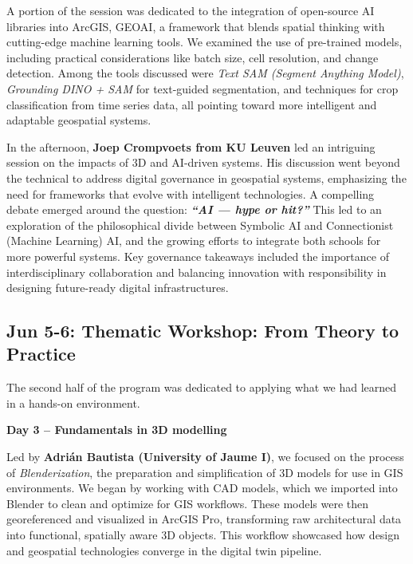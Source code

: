 \documentclass[
  letterpaper,
  DIV=11,
  numbers=noendperiod]{scrartcl}
\begin{document}
A portion of the session was dedicated to the integration of open-source
AI libraries into ArcGIS, GEOAI, a framework that blends spatial
thinking with cutting-edge machine learning tools. We examined the use
of pre-trained models, including practical considerations like batch
size, cell resolution, and change detection. Among the tools discussed
were \emph{Text SAM (Segment Anything Model)}, \emph{Grounding DINO +
SAM} for text-guided segmentation, and techniques for crop
classification from time series data, all pointing toward more
intelligent and adaptable geospatial systems.

In the afternoon, \textbf{Joep Crompvoets from KU Leuven} led an
intriguing session on the impacts of 3D and AI-driven systems. His
discussion went beyond the technical to address digital governance in
geospatial systems, emphasizing the need for frameworks that evolve with
intelligent technologies. A compelling debate emerged around the
question: \textbf{\emph{``AI --- hype or hit?''}} This led to an
exploration of the philosophical divide between Symbolic AI and
Connectionist (Machine Learning) AI, and the growing efforts to
integrate both schools for more powerful systems. Key governance
takeaways included the importance of interdisciplinary collaboration and
balancing innovation with responsibility in designing future-ready
digital infrastructures.

\subsection{\texorpdfstring{\textbf{Jun 5-6: Thematic Workshop: From
Theory to
Practice}}{Jun 5-6: Thematic Workshop: From Theory to Practice}}\label{jun-5-6-thematic-workshop-from-theory-to-practice}

The second half of the program was dedicated to applying what we had
learned in a hands-on environment.

\textbf{Day 3 -- Fundamentals in 3D modelling}

Led by \textbf{Adrián Bautista (University of Jaume I)}, we focused on
the process of \emph{Blenderization}, the preparation and simplification
of 3D models for use in GIS environments. We began by working with CAD
models, which we imported into Blender to clean and optimize for GIS
workflows. These models were then georeferenced and visualized in ArcGIS
Pro, transforming raw architectural data into functional, spatially
aware 3D objects. This workflow showcased how design and geospatial
technologies converge in the digital twin pipeline.
\end{document}
